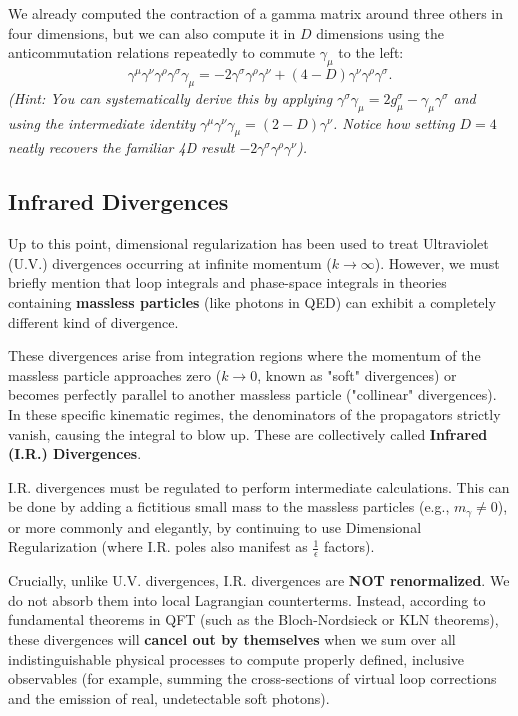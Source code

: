 \begin{example}[Exercise]
    We already computed the contraction of a gamma matrix around three others in four dimensions, but we can also compute it in \(D\) dimensions using the anticommutation relations repeatedly to commute \(\gamma_\mu\) to the left:
    \[
        \gamma^{\mu} \gamma^{\nu} \gamma^{\rho} \gamma^{\sigma} \gamma_{\mu} = -2\gamma^\sigma \gamma^\rho \gamma^\nu + (4-D)\gamma^\nu \gamma^\rho \gamma^\sigma.
    \]
    \textit{(Hint: You can systematically derive this by applying \(\gamma^\sigma \gamma_\mu = 2g^\sigma_\mu - \gamma_\mu \gamma^\sigma\) and using the intermediate identity \(\gamma^\mu \gamma^\nu \gamma_\mu = (2-D)\gamma^\nu\). Notice how setting \(D=4\) neatly recovers the familiar 4D result \(-2\gamma^\sigma \gamma^\rho \gamma^\nu\)).}
\end{example}

\subsection{Infrared Divergences}

Up to this point, dimensional regularization has been used to treat Ultraviolet (U.V.) divergences occurring at infinite momentum (\(k \to \infty\)). However, we must briefly mention that loop integrals and phase-space integrals in theories containing \textbf{massless particles} (like photons in QED) can exhibit a completely different kind of divergence.

These divergences arise from integration regions where the momentum of the massless particle approaches zero (\(k \to 0\), known as "soft" divergences) or becomes perfectly parallel to another massless particle ("collinear" divergences). In these specific kinematic regimes, the denominators of the propagators strictly vanish, causing the integral to blow up. These are collectively called \textbf{Infrared (I.R.) Divergences}.

I.R. divergences must be regulated to perform intermediate calculations. This can be done by adding a fictitious small mass to the massless particles (e.g., \(m_\gamma \neq 0\)), or more commonly and elegantly, by continuing to use Dimensional Regularization (where I.R. poles also manifest as \(\frac{1}{\epsilon}\) factors).

Crucially, unlike U.V. divergences, I.R. divergences are \textbf{NOT renormalized}. We do not absorb them into local Lagrangian counterterms. Instead, according to fundamental theorems in QFT (such as the Bloch-Nordsieck or KLN theorems), these divergences will \textbf{cancel out by themselves} when we sum over all indistinguishable physical processes to compute properly defined, inclusive observables (for example, summing the cross-sections of virtual loop corrections and the emission of real, undetectable soft photons).